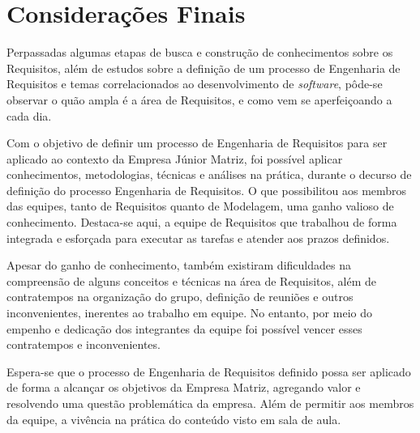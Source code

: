 \chapter[Considerações Finais]{Considerações Finais}

Perpassadas algumas etapas de busca e construção de conhecimentos sobre os Requisitos, além de estudos sobre a definição de um processo de Engenharia de Requisitos e temas correlacionados ao desenvolvimento de \textit{software}, pôde-se observar o quão ampla é a área de Requisitos, e como vem se aperfeiçoando a cada dia.

Com o objetivo de definir um processo de Engenharia de Requisitos para ser aplicado ao contexto da Empresa Júnior Matriz, foi possível aplicar conhecimentos, metodologias, técnicas e análises na prática, durante o decurso de definição do processo Engenharia de Requisitos. O que possibilitou aos membros das equipes, tanto de Requisitos quanto de Modelagem, uma ganho valioso de conhecimento. Destaca-se aqui, a equipe de Requisitos que trabalhou de forma integrada e esforçada para executar as tarefas e atender aos prazos definidos.

Apesar do ganho de conhecimento, também existiram dificuldades na compreensão de alguns conceitos e técnicas na área de Requisitos, além de contratempos na 
organização do grupo, definição de reuniões e outros inconvenientes, inerentes ao trabalho em equipe. 
No entanto, por meio do empenho e dedicação dos integrantes da equipe foi possível vencer esses contratempos e inconvenientes.

Espera-se que o processo de Engenharia de Requisitos definido possa ser aplicado de forma a alcançar os objetivos da Empresa Matriz, agregando valor e 
resolvendo uma questão problemática da empresa. Além de permitir aos membros da equipe, a vivência na prática do conteúdo visto em sala de aula. 